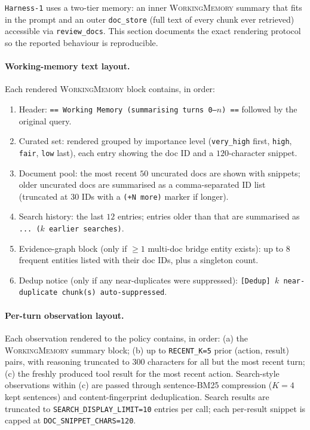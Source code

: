 \documentclass{article}
\newcommand{\sys}{\texttt{Harness-1}\xspace}
\newcommand{\wm}{\textsc{WorkingMemory}\xspace}
\begin{document}
\sys uses a two-tier memory: an inner \wm summary that fits in
the prompt and an outer \texttt{doc\_store} (full text of every
chunk ever retrieved) accessible via \texttt{review\_docs}. This
section documents the exact rendering protocol so the reported
behaviour is reproducible.

\paragraph{Working-memory text layout.} Each rendered \wm block
contains, in order:
\begin{enumerate}[leftmargin=1.4em,itemsep=2pt,topsep=2pt]
\item Header: \texttt{== Working Memory (summarising turns
0--$n$) ==} followed by the original query.
\item Curated set: rendered grouped by importance level
(\texttt{very\_high} first, \texttt{high}, \texttt{fair},
\texttt{low} last), each entry showing the doc ID and a
$120$-character snippet.
\item Document pool: the most recent $50$ uncurated docs are
shown with snippets; older uncurated docs are summarised as a
comma-separated ID list (truncated at $30$ IDs with a
\texttt{(+N more)} marker if longer).
\item Search history: the last $12$ entries; entries older than
that are summarised as
\texttt{... ($k$ earlier searches)}.
\item Evidence-graph block (only if $\geq 1$ multi-doc bridge
entity exists): up to $8$ frequent entities listed with their
doc IDs, plus a singleton count.
\item Dedup notice (only if any near-duplicates were
suppressed): \texttt{[Dedup] $k$ near-duplicate chunk(s)
auto-suppressed}.
\end{enumerate}

\paragraph{Per-turn observation layout.} Each observation
rendered to the policy contains, in order: (a) the \wm summary
block; (b) up to \texttt{RECENT\_K=5} prior (action, result)
pairs, with reasoning truncated to $300$ characters for all but
the most recent turn; (c) the freshly produced tool result for
the most recent action. Search-style observations within (c) are
passed through sentence-BM25 compression ($K{=}4$ kept sentences)
and content-fingerprint deduplication. Search results are
truncated to \texttt{SEARCH\_DISPLAY\_LIMIT=10} entries per call;
each per-result snippet is capped at
\texttt{DOC\_SNIPPET\_CHARS=120}.
\end{document}
